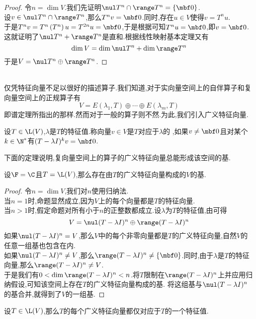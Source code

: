 \documentclass{ctexart}
\begin{document}
\begin{proof}
    令$n=\dim V$.我们先证明$\nul T^n\cap\range T^n=\{\mbf0\}$.\\
    设$v\in\nul T^n\cap\range T^n$,那么$T^nv=\mbf0$.同时,存在$u\in V$使得$v=T^nu$.\\
    于是$T^nv=T^n\left(T^n\right)u=T^{2n}u=\mbf0$,于是根据可知$T^nu=\mbf0$,即$v=\mbf0$.\\
    这就证明了$\nul T^n+\range T^n$是直和.根据线性映射基本定理又有
    \[\dim V=\dim \nul T^n+\dim\range T^n\]
    于是$V=\nul T^n\oplus\range T^n$.
\end{proof}\noindent
{}\\
仅凭特征向量不足以很好的描述算子.我们知道,对于实向量空间上的自伴算子和复向量空间上的正规算子有
\[V=E(\lambda_1,T)\oplus\cdots\oplus E(\lambda_m,T)\]
即谱定理所指出的那样.然而对于一般的算子则不然.为此,我们引入广义特征向量.
\begin{definition}[2.1 定义:广义特征向量]
    设$T\in\L(V)$,$\lambda$是$T$的特征值.称向量$v\in V$是$T$对应于$\lambda$的%
    ,如果$v\neq\mbf0$且对某个$k\in\N^*$有$(T-\lambda I)^kv=\mbf0$.
\end{definition}\noindent
下面的定理说明,复向量空间上的算子的广义特征向量总能形成该空间的基.
\begin{formal}[2.2 广义特征向量构成基]
    设$\F=\C$且$T=\L(V)$,那么存在由$T$的广义特征向量构成的$V$的基.
\end{formal}
\begin{proof}
    令$n=\dim V$,我们对$n$使用归纳法.\\
    当$n=1$时,命题显然成立,因为$V$上的每个向量都是$T$的特征向量.\\
    当$n>1$时,假定命题对所有小于$n$的正整数都成立.设$\lambda$为$T$的特征值,由可得
    \[V=\nul(T-\lambda I)^n\oplus\range(T-\lambda I)^n\]
    如果$\nul(T-\lambda I)^n=V$,那么$V$中的每个非零向量都是$T$的广义特征向量,自然$V$的任意一组基也包含在内.\\
    如果$\nul(T-\lambda I)^n\neq V$,那么$\range(T-\lambda I)^n\neq\{\mbf0\}$.同时,由于$\lambda$是$T$的特征向量,那么$\range(T-\lambda I)^n\neq V$.\\
    于是我们有$0<\dim\range(T-\lambda I)^n<n$.将$T$限制在$\range(T-\lambda I)^n$上并应用归纳假设,可知该空间上存在$T$的广义特征向量构成的基.%
    将这组基与$\nul(T-\lambda I)^n$的基合并,就得到了$V$的一组基.
\end{proof}
\begin{formal}[2.3 广义特征向量对应唯一特征值]
    设$T\in\L(V)$,那么$T$的每个广义特征向量都仅对应于$T$的一个特征值.
\end{formal}
\end{document}
